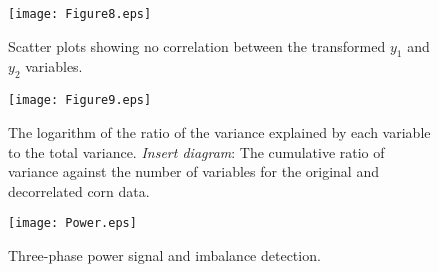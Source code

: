 \documentclass[review]{elsarticle}
\theoremstyle{plain}
\theoremstyle{remark}
\theoremstyle{plain}
\theoremstyle{definition}
\theoremstyle{prop}
\theoremstyle{definition}
\theoremstyle{plain}
\theoremstyle{plain}
\begin{document}
\begin{figure}[t]
\centering
{\texttt{[image: Figure8.eps]}}
\caption{\label{fig:RankRed2}Scatter plots showing no correlation between the transformed $y_1$ and $y_2$ variables.}
\end{figure}

\begin{figure}[t]
\centering
{\texttt{[image: Figure9.eps]}}
\caption{\label{fig:RankRedCorn}The logarithm of the ratio of the variance explained by each variable to the total variance. \emph{Insert diagram}: The cumulative ratio of variance against the number of variables for the original and decorrelated corn data.}
\end{figure}

\begin{figure}[t]
    \centering
    {\texttt{[image: Power.eps]}}
    \caption{Three-phase power signal and imbalance detection.}
    \label{fig:powimbal}
\end{figure}
\end{document}
